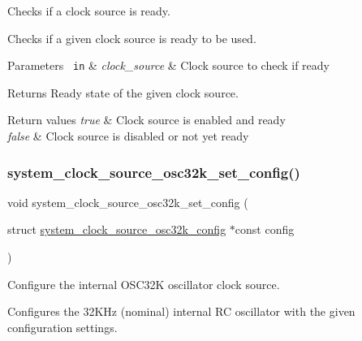 Checks if a clock source is ready. 

Checks if a given clock source is ready to be used.


\begin{DoxyParams}[1]{Parameters}
\mbox{\texttt{ in}}  & {\em clock\+\_\+source} & Clock source to check if ready\\
\hline
\end{DoxyParams}
\begin{DoxyReturn}{Returns}
Ready state of the given clock source.
\end{DoxyReturn}

\begin{DoxyRetVals}{Return values}
{\em true} & Clock source is enabled and ready \\
\hline
{\em false} & Clock source is disabled or not yet ready \\
\hline
\end{DoxyRetVals}
\mbox{\label{group__asfdoc__sam0__system__clock__group_ga9c110273354846e5a6cf877d6180296f}} 
\subsubsection{\texorpdfstring{system\_clock\_source\_osc32k\_set\_config()}{system\_clock\_source\_osc32k\_set\_config()}}
{\footnotesize\ttfamily void system\+\_\+clock\+\_\+source\+\_\+osc32k\+\_\+set\+\_\+config (\begin{DoxyParamCaption}\item[{struct \mbox{\hyperlink{structsystem__clock__source__osc32k__config}{system\+\_\+clock\+\_\+source\+\_\+osc32k\+\_\+config}} $\ast$const}]{config }\end{DoxyParamCaption})}



Configure the internal O\+S\+C32K oscillator clock source. 

Configures the 32K\+Hz (nominal) internal RC oscillator with the given configuration settings.


